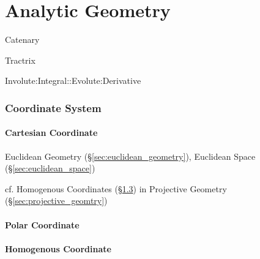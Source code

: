\part{Analytic Geometry}\label{sec:analytic_geometry}

Catenary

Tractrix

Involute:Integral::Evolute:Derivative



\section{Coordinate System}\label{sec:coordinate_system}

\subsection{Cartesian Coordinate}\label{sec:cartesian_coordinate}

Euclidean Geometry (\S\ref{sec:euclidean_geometry}), Euclidean Space
(\S\ref{sec:euclidean_space})

cf. Homogenous Coordinates (\S\ref{sec:homogenous_coordinate}) in
Projective Geometry (\S\ref{sec:projective_geomtry})



\subsection{Polar Coordinate}\label{sec:polar_coordinate}

\subsection{Homogenous Coordinate}\label{sec:homogenous_coordinate}

